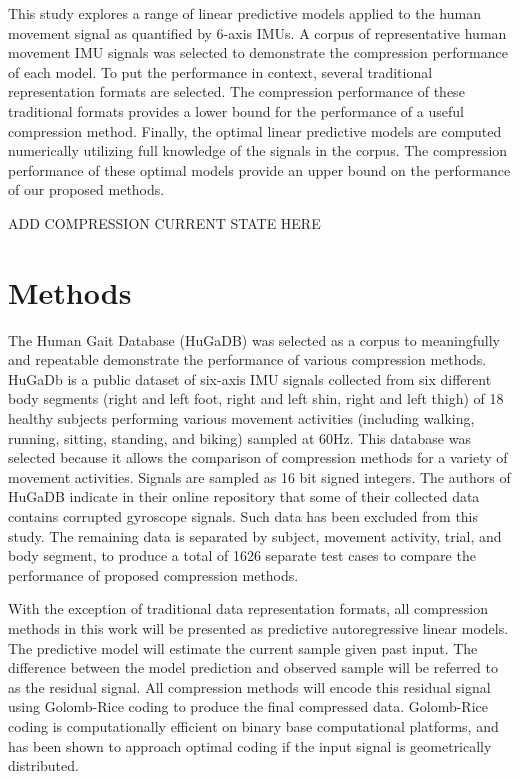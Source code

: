 \documentclass[journal]{IEEEtran}
\begin{document}
This study explores a range of linear predictive models applied to the human movement signal as quantified by 6-axis IMUs. A corpus of representative human movement IMU signals was selected to demonstrate the compression performance of each model. To put the performance in context, several traditional representation formats are selected. The compression performance of these traditional formats provides a lower bound for the performance of a useful compression method. Finally, the optimal linear predictive models are computed numerically utilizing full knowledge of the signals in the corpus. The compression performance of these optimal models provide an upper bound on the performance of our proposed methods.

ADD COMPRESSION CURRENT STATE HERE

\section{Methods}


The Human Gait Database (HuGaDB)\cite{Chereshnev2018} was selected as a corpus to meaningfully and repeatable demonstrate the performance of various compression methods. HuGaDb is a public dataset of six-axis IMU signals collected from six different body segments (right and left foot, right and left shin, right and left thigh) of 18 healthy subjects performing various movement activities (including walking, running, sitting, standing, and biking) sampled at 60Hz. This database was selected because it allows the comparison of compression methods for a variety of movement activities. Signals are sampled as 16 bit signed integers. The authors of HuGaDB indicate in their online repository that some of their collected data contains corrupted gyroscope signals. Such data has been excluded from this study. The remaining data is separated by subject, movement activity, trial, and body segment, to produce a total of 1626 separate test cases to compare the performance of proposed compression methods.

With the exception of traditional data representation formats, all compression methods in this work will be presented as predictive autoregressive linear models. The predictive model will estimate the current sample given past input. The difference between the model prediction and observed sample will be referred to as the residual signal. All compression methods will encode this residual signal using Golomb-Rice coding to produce the final compressed data. Golomb-Rice coding is computationally efficient on binary base computational platforms, and has been shown to approach optimal coding if the input signal is geometrically distributed\cite{Golomb1966}\cite{F.Rice1979}.
\end{document}
